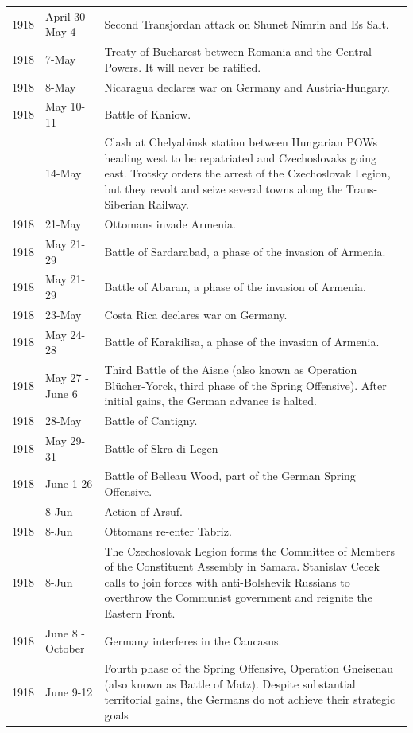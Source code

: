 \documentclass[
  openany]{book}
\begin{document}
\begin{longtable}[t]{rl>{\raggedright\arraybackslash}p{22em}}
1918 & April 30 - May 4 & Second Transjordan attack on Shunet Nimrin and Es Salt.\\
\rowcolor{gray!6}  1918 & 7-May & Treaty of Bucharest between Romania and the Central Powers. It will never be ratified.\\
1918 & 8-May & Nicaragua declares war on Germany and Austria-Hungary.\\
\rowcolor{gray!6}  1918 & May 10-11 & Battle of Kaniow.\\
\addlinespace
1918 & 14-May & Clash at Chelyabinsk station between Hungarian POWs heading west to be repatriated and Czechoslovaks going east. Trotsky orders the arrest of the Czechoslovak Legion, but they revolt and seize several towns along the Trans-Siberian Railway.\\
\rowcolor{gray!6}  1918 & 21-May & Ottomans invade Armenia.\\
1918 & May 21-29 & Battle of Sardarabad, a phase of the invasion of Armenia.\\
\rowcolor{gray!6}  1918 & May 21-29 & Battle of Abaran, a phase of the invasion of Armenia.\\
1918 & 23-May & Costa Rica declares war on Germany.\\
\addlinespace
\rowcolor{gray!6}  1918 & May 24-28 & Battle of Karakilisa, a phase of the invasion of Armenia.\\
1918 & May 27 - June 6 & Third Battle of the Aisne (also known as Operation Blücher-Yorck, third phase of the Spring Offensive). After initial gains, the German advance is halted.\\
\rowcolor{gray!6}  1918 & 28-May & Battle of Cantigny.\\
1918 & May 29-31 & Battle of Skra-di-Legen\\
\rowcolor{gray!6}  1918 & June 1-26 & Battle of Belleau Wood, part of the German Spring Offensive.\\
\addlinespace
1918 & 8-Jun & Action of Arsuf.\\
\rowcolor{gray!6}  1918 & 8-Jun & Ottomans re-enter Tabriz.\\
1918 & 8-Jun & The Czechoslovak Legion forms the Committee of Members of the Constituent Assembly in Samara. Stanislav Cecek calls to join forces with anti-Bolshevik Russians to overthrow the Communist government and reignite the Eastern Front.\\
\rowcolor{gray!6}  1918 & June 8 - October & Germany interferes in the Caucasus.\\
1918 & June 9-12 & Fourth phase of the Spring Offensive, Operation Gneisenau (also known as Battle of Matz). Despite substantial territorial gains, the Germans do not achieve their strategic goals\\

\end{longtable}
\end{document}
